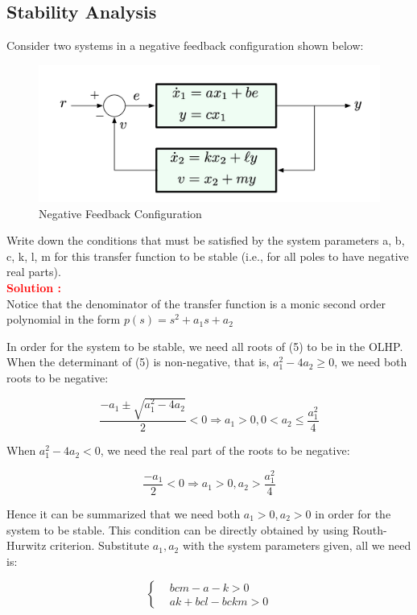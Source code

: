 \documentclass[12pt]{article}
\begin{document}
\clearpage
\subsection{Stability Analysis}

Consider two systems in a negative feedback configuration shown below:
\begin{figure}[h!]
    \centering
    \includegraphics[width=0.75\linewidth]{figs/4.5.png}
    \caption{Negative Feedback Configuration}
    \label{fig:enter-label}
\end{figure}


Write down the conditions that must be satisfied by the system parameters
a, b, c, k, l, m for this transfer function to be stable (i.e., for all poles to have
negative real parts). \\
\textbf{\textcolor{red}{Solution :}} \\
Notice that the denominator of the transfer function is a monic second order polynomial in the form $p(s)=s^{2}+a_{1} s+a_{2} $


In order for the system to be stable, we need all roots of (5) to be in the OLHP. When the determinant of (5) is non-negative, that is, $a_{1}^{2}-4 a_{2} \geq 0$, we need both roots to be negative:

$$
\frac{-a_{1} \pm \sqrt{a_{1}^{2}-4 a_{2}}}{2}<0 \Rightarrow a_{1}>0,0<a_{2} \leq \frac{a_{1}^{2}}{4}
$$

When $a_{1}^{2}-4 a_{2}<0$, we need the real part of the roots to be negative:

$$
\frac{-a_{1}}{2}<0 \Rightarrow a_{1}>0, a_{2}>\frac{a_{1}^{2}}{4}
$$

Hence it can be summarized that we need both $a_{1}>0, a_{2}>0$ in order for the system to be stable. This condition can be directly obtained by using Routh-Hurwitz criterion. Substitute $a_{1}, a_{2}$ with the system parameters given, all we need is:

$$
\left\{\begin{aligned}
& b c m-a-k>0 \\
& a k+b c l-b c k m>0
\end{aligned}\right.
$$
\end{document}
